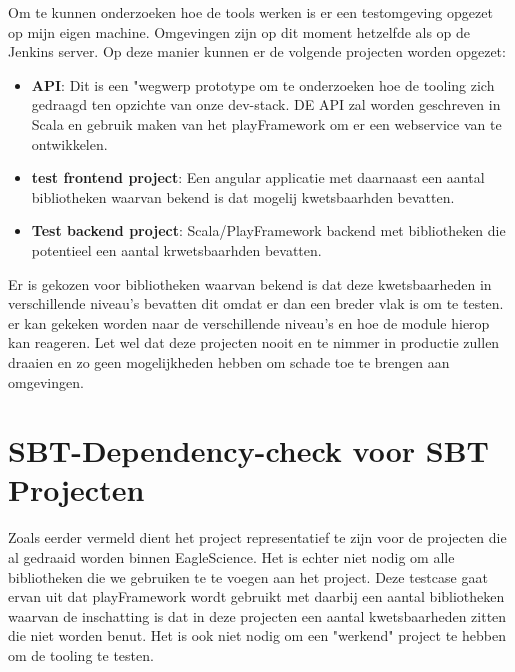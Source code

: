 Om te kunnen onderzoeken hoe de tools werken is er een testomgeving opgezet op mijn eigen machine. Omgevingen zijn op dit moment hetzelfde als op de Jenkins server. Op deze manier kunnen er de volgende projecten worden opgezet:
\begin{itemize}
    \item \textbf{API}: Dit is een "wegwerp prototype om te onderzoeken hoe de tooling zich gedraagd ten opzichte van onze dev-stack. DE API zal worden geschreven in Scala en gebruik maken van het playFramework om er een webservice van te ontwikkelen.
    \item \textbf{test frontend project}: Een angular applicatie met daarnaast een aantal bibliotheken waarvan bekend is dat mogelij kwetsbaarhden bevatten.
    \item \textbf{Test backend project}: Scala/PlayFramework backend met bibliotheken die potentieel een aantal krwetsbaarhden bevatten.
\end{itemize}
Er is gekozen voor bibliotheken waarvan bekend is dat deze kwetsbaarheden in verschillende niveau's bevatten dit omdat er dan een breder vlak is om te testen. er kan gekeken worden naar de verschillende niveau's en hoe de module hierop kan reageren. Let wel dat deze projecten nooit en te nimmer in productie zullen draaien en zo geen mogelijkheden hebben om schade toe te brengen aan omgevingen.



\section{SBT-Dependency-check voor SBT Projecten}\label{sec:sbt-dependency-check-voor-sbt-projecten}
Zoals eerder vermeld dient het project representatief te zijn voor de projecten die al gedraaid worden binnen EagleScience. Het is echter niet nodig om alle bibliotheken die we gebruiken te te voegen aan het project. Deze testcase gaat ervan uit dat playFramework wordt gebruikt met daarbij een aantal bibliotheken waarvan de inschatting is dat in deze projecten een aantal kwetsbaarheden zitten die niet worden benut. Het is ook niet nodig om een "werkend" project te hebben om de tooling te testen.

